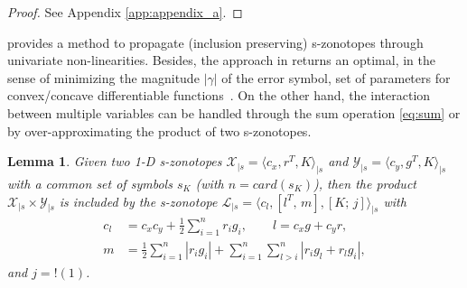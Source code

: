\documentclass[journal]{IEEEtran}
\newtheorem{mylemma}{Lemma}
\begin{document}
\begin{proof}
See Appendix \ref{app:appendix_a}.
\end{proof}

 provides a method to propagate (inclusion preserving) s-zonotopes through univariate non-linearities. Besides, the approach in   returns an optimal, in the sense of minimizing the magnitude $|\gamma|$ of the error symbol, set of parameters for convex/concave differentiable functions~\cite{combastel2020functional}. On the other hand, the interaction between multiple variables can be handled through the sum operation \eqref{eq:sum} or by over-approximating the product of two s-zonotopes.

\begin{mylemma}\label{lem:multiplication}
Given two 1-D s-zonotopes $\mathcal{X}_{|s} = \langle c_x, r^T, K\rangle_{|s}$ and $\mathcal{Y}_{|s}= \langle c_y, g^T, K\rangle_{|s}$ with a common set of symbols $s_K$ (with $n = card(s_K)$), then the product $\mathcal{X}_{|s} \times \mathcal{Y}_{|s}$ is included by the s-zonotope $\mathcal{L}_{|s} = \langle c_l, [l^T, \, m], [K; \, j]\rangle_{|s}$  with
\begin{equation}
\begin{aligned}
   c_l &= c_xc_y + \frac{1}{2}\sum_{i=1}^nr_ig_i, \quad \quad  l = c_xg + c_yr, \\
   m &= \frac{1}{2}\sum_{i=1}^n|r_ig_i| + \sum_{i=1}^n\sum_{l>i}^n |r_ig_l + r_lg_i|,
\end{aligned}
\end{equation}
\noindent and $j = !(1)$.
\end{mylemma}
\end{document}
